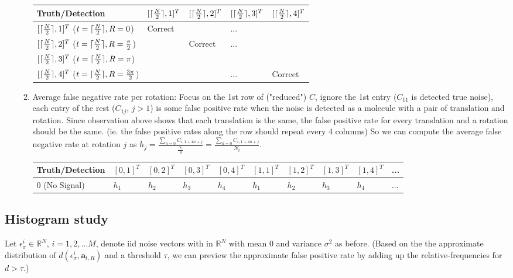 \documentclass[11pt]{article}
\DeclarePairedDelimiter{\ceil}{\lceil}{\rceil}
\newcommand{\ba}{\boldsymbol{a}}
\begin{document}
\begin{enumerate}
\begin{enumerate}
                \begin{tabular}{l|l|l|l|l}
                    Truth/Detection&$[\ceil{\frac{N}{2}}, 1]^T$&$[\ceil{\frac{N}{2}}, 2]^T$&$[\ceil{\frac{N}{2}}, 3]^T$&$[\ceil{\frac{N}{2}}, 4]^T$\\\hline
                    $[\ceil{\frac{N}{2}}, 1]^T$ ($t=\ceil{\frac{N}{2}},R=0$)&Correct& &...& \\\hline
                    $[\ceil{\frac{N}{2}}, 2]^T$ ($t=\ceil{\frac{N}{2}},R=\frac{\pi}{2}$)& &Correct&...& \\\hline
                    $[\ceil{\frac{N}{2}}, 3]^T$ ($t=\ceil{\frac{N}{2}},R=\pi$)& & & & \\\hline
                    $[\ceil{\frac{N}{2}}, 4]^T$ ($t=\ceil{\frac{N}{2}},R=\frac{3\pi}{2}$)& & &...&Correct\\\hline
                \end{tabular}
                
                \item Average false negative rate per rotation: Focus on the 1st row of ("reduced") $C$, ignore the 1st entry ($C_{11}$ is detected true noise), each entry of the rest ($C_{1j}$, $j>1$) is some false positive rate when the noise is detected as a molecule with a pair of translation and rotation. Since observation above shows that each translation is the same, the false positive rate for every translation and a rotation should be the same. (ie. the false positive rates along the row should repeat every 4 columns) So we can compute the average false negative rate at rotation $j$ as $h_j = \frac{\sum_{n=0} C_{i, 1+4n + j}}{\frac{N_c}{4}}=\frac{\sum_{n=0} C_{i, 1+4n + j}}{N_t}$.
                
                \begin{tabular}{l|l|l|l|l|l|l|l|l|l}
                    Truth/Detection&$[0, 1]^T$&$[0, 2]^T$&$[0, 3]^T$&$[0, 4]^T$&$[1, 1]^T$&$[1, 2]^T$&$[1, 3]^T$&$[1, 4]^T$&...\\\hline
                    $0$ (No Signal)&$h_1$&$h_2$&$h_3$&$h_4$&$h_1$&$h_2$&$h_3$&$h_4$&... \\\hline
                \end{tabular}
                
            \end{enumerate}
            
        \end{enumerate}
        

\subsection{Histogram study}
Let $\epsilon_{\sigma}^{i}  \in \mathbb{R}^{N}$, $i=1,2,\ldots M$, denote iid noise vectors with in $\mathbb{R}^{N}$ with mean $0$ and variance $\sigma^2$ as before. (Based on the the approximate distribution of $d(\epsilon_{\sigma}^i, \ba_{t,R})$ and a threshold $\tau$, we can preview the approximate false positive rate by adding up the relative-frequencies for $d>\tau$.)
\end{document}
